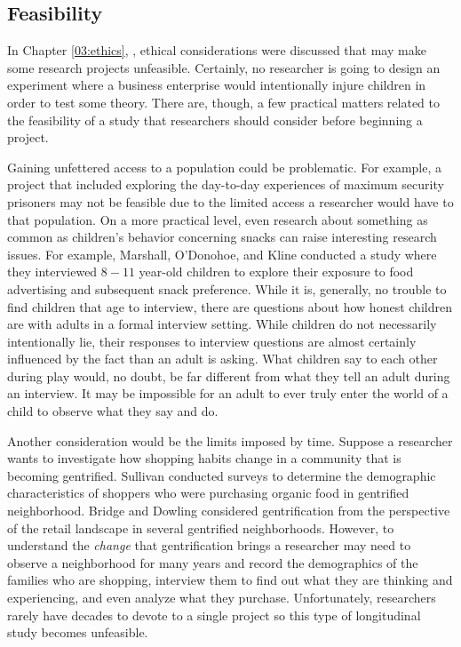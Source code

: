 \subsection{Feasibility}

In Chapter \ref{03:ethics}, , ethical considerations were discussed that may make some research projects unfeasible. Certainly, no researcher is going to design an experiment where a business enterprise would intentionally injure children in order to test some theory. There are, though, a few practical matters related to the feasibility of a study that researchers should consider before beginning a project. 

Gaining unfettered access to a population could be problematic. For example, a project that included exploring the day-to-day experiences of maximum security prisoners may not be feasible due to the limited access a researcher would have to that population. On a more practical level, even research about something as common as children's behavior concerning snacks can raise interesting research issues. For example, Marshall, O'Donohoe, and Kline\cite{marshall2007families} conducted a study where they interviewed $ 8-11 $ year-old children to explore their exposure to food advertising and subsequent snack preference. While it is, generally, no trouble to find children that age to interview, there are questions about how honest children are with adults in a formal interview setting. While children do not necessarily intentionally lie, their responses to interview questions are almost certainly influenced by the fact than an adult is asking. What children say to each other during play would, no doubt, be far different from what they tell an adult during an interview. It may be impossible for an adult to ever truly enter the world of a child to observe what they say and do. 

Another consideration would be the limits imposed by time. Suppose a researcher wants to investigate how shopping habits change in a community that is becoming gentrified. Sullivan\cite{sullivan2014food} conducted surveys to determine the demographic characteristics of shoppers who were purchasing organic food in gentrified neighborhood. Bridge and Dowling\cite{bridge2001microgeographies} considered gentrification from the perspective of the retail landscape in several gentrified neighborhoods. However, to understand the \textit{change} that gentrification brings a researcher may need to observe a neighborhood for many years and record the demographics of the families who are shopping, interview them to find out what they are thinking and experiencing, and even analyze what they purchase. Unfortunately, researchers rarely have decades to devote to a single project so this type of longitudinal study becomes unfeasible.

